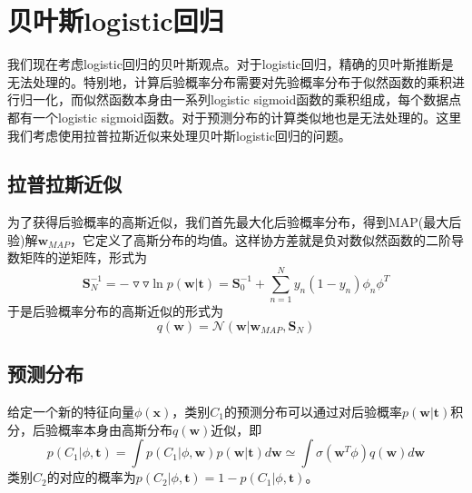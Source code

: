 \section{贝叶斯logistic回归}
我们现在考虑logistic回归的贝叶斯观点。对于logistic回归，精确的贝叶斯推断是无法处理的。特别地，计算后验概率分布需要对先验概率分布于似然函数的乘积进行归一化，而似然函数本身由一系列logistic sigmoid函数的乘积组成，每个数据点都有一个logistic sigmoid函数。对于预测分布的计算类似地也是无法处理的。这里我们考虑使用拉普拉斯近似来处理贝叶斯logistic回归的问题。
\subsection*{拉普拉斯近似}
为了获得后验概率的高斯近似，我们首先最大化后验概率分布，得到MAP(最大后验)解$\boldsymbol{w}_{MAP}$，它定义了高斯分布的均值。这样协方差就是负对数似然函数的二阶导数矩阵的逆矩阵，形式为
\begin{equation}
	\boldsymbol{S}_N^{-1}=-\triangledown\triangledown \ln p(\boldsymbol{w}|\boldsymbol{t})=\boldsymbol{S}_0^{-1}+\sum_{n=1}^{N}y_n(1-y_n)\phi_n\phi^T
\end{equation}
于是后验概率分布的高斯近似的形式为
\begin{equation}
\label{lala}
	q(\boldsymbol{w})=\mathcal{N}(\boldsymbol{w}|\boldsymbol{w}_{MAP},\boldsymbol{S}_N)
\end{equation}
\subsection*{预测分布}
给定一个新的特征向量$\phi(\boldsymbol{x})$，类别$C_1$的预测分布可以通过对后验概率$p(\boldsymbol{w}|\boldsymbol{t})$积分，后验概率本身由高斯分布$q(\boldsymbol{w})$近似，即
\begin{equation}
	p(C_1|\phi,\boldsymbol{t})=\int p(C_1|\phi,\boldsymbol{w})p(\boldsymbol{w}|\boldsymbol{t})d\boldsymbol{w}\simeq \int \sigma(\boldsymbol{w}^T\phi)q(\boldsymbol{w})d\boldsymbol{w}
\end{equation}
类别$C_2$的对应的概率为$p(C_2|\phi,\boldsymbol{t})=1-p(C_1|\phi,\boldsymbol{t})$。

